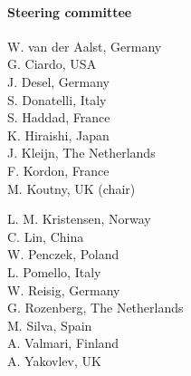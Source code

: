 \documentclass[10pt,a4paper]{article}
\newcommand{\styleUniv}[1]{\textcolor{black!75}{#1}}
\begin{document}
\begin{multicols}{2}



\columnbreak

\paragraph*{Steering committee}\mbox{}

\setlength{\columnsep}{0.2cm}
\begin{multicols}{2}
\noindent W. van der Aalst, Germany\\
G. Ciardo, USA\\
J. Desel, Germany\\
S. Donatelli, Italy\\
S. Haddad, France\\
K. Hiraishi, Japan\\
J. Kleijn, The Netherlands\\
F. Kordon, France\\
M. Koutny, UK (chair)\\

\columnbreak

\noindent L. M. Kristensen, Norway\\
C. Lin, China\\
W. Penczek, Poland\\
L. Pomello, Italy\\
W. Reisig, Germany\\
G. Rozenberg, The Netherlands\\
M. Silva, Spain\\
A. Valmari, Finland\\
A. Yakovlev, UK\\
\end{multicols}


\end{multicols}
\end{document}
